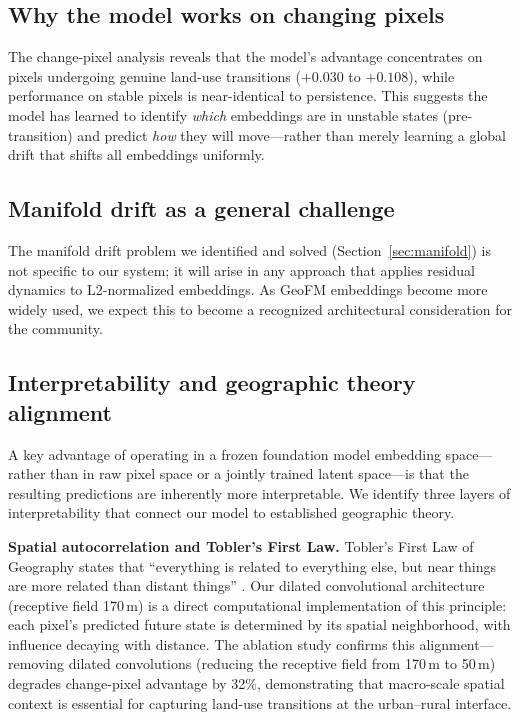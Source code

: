 \documentclass{article}
\begin{document}
\subsection{Why the model works on changing pixels}

The change-pixel analysis reveals that the model's advantage concentrates on pixels undergoing genuine land-use transitions ($+0.030$ to $+0.108$), while performance on stable pixels is near-identical to persistence. This suggests the model has learned to identify \textit{which} embeddings are in unstable states (pre-transition) and predict \textit{how} they will move---rather than merely learning a global drift that shifts all embeddings uniformly.

\subsection{Manifold drift as a general challenge}

The manifold drift problem we identified and solved (Section~\ref{sec:manifold}) is not specific to our system; it will arise in any approach that applies residual dynamics to L2-normalized embeddings. As GeoFM embeddings become more widely used, we expect this to become a recognized architectural consideration for the community.

\subsection{Interpretability and geographic theory alignment}
\label{sec:interpretability}

A key advantage of operating in a frozen foundation model embedding space---rather than in raw pixel space or a jointly trained latent space---is that the resulting predictions are inherently more interpretable. We identify three layers of interpretability that connect our model to established geographic theory.

\textbf{Spatial autocorrelation and Tobler's First Law.}
Tobler's First Law of Geography states that ``everything is related to everything else, but near things are more related than distant things'' \citep{tobler1970computer}. Our dilated convolutional architecture (receptive field 170\,m) is a direct computational implementation of this principle: each pixel's predicted future state is determined by its spatial neighborhood, with influence decaying with distance. The ablation study confirms this alignment---removing dilated convolutions (reducing the receptive field from 170\,m to 50\,m) degrades change-pixel advantage by 32\%, demonstrating that macro-scale spatial context is essential for capturing land-use transitions at the urban--rural interface.
\end{document}
